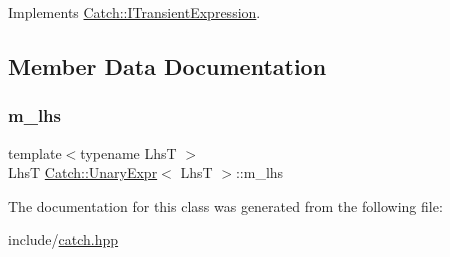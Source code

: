 Implements \mbox{\hyperlink{struct_catch_1_1_i_transient_expression_aabe1889df9c6e639a24afb08d8a0fe9e}{Catch\+::\+I\+Transient\+Expression}}.



\subsection{Member Data Documentation}
\mbox{\label{class_catch_1_1_unary_expr_a7b6e97e576377dd60c77ab551a180325}} 
\subsubsection{\texorpdfstring{m\_lhs}{m\_lhs}}
{\footnotesize\ttfamily template$<$typename LhsT $>$ \\
LhsT \mbox{\hyperlink{class_catch_1_1_unary_expr}{Catch\+::\+Unary\+Expr}}$<$ LhsT $>$\+::m\+\_\+lhs\hspace{0.3cm}{\ttfamily [private]}}



The documentation for this class was generated from the following file\+:\begin{DoxyCompactItemize}
\item 
include/\mbox{\hyperlink{catch_8hpp}{catch.\+hpp}}\end{DoxyCompactItemize}
